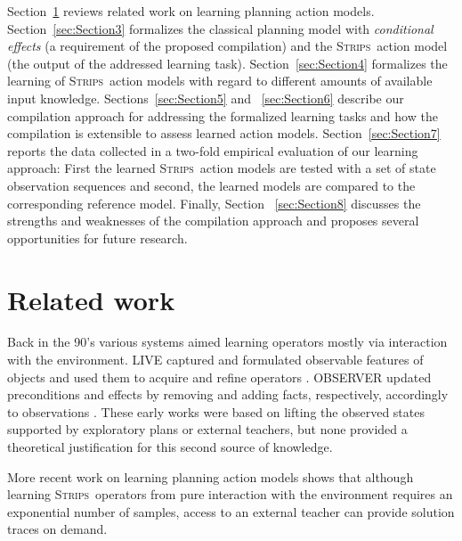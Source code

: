 \documentclass[3p,times]{elsarticle}
\newcommand{\strips}{\textsc{Strips}}     %
\begin{document}
Section~\ref{sec:Section2} reviews related work on learning planning action models. Section~\ref{sec:Section3} formalizes the classical planning model with {\em conditional effects} (a requirement of the proposed compilation) and the \strips\ action model (the output of the addressed learning task). Section~\ref{sec:Section4} formalizes the learning of \strips\ action models with regard to different amounts of available input knowledge. Sections~\ref{sec:Section5} and ~\ref{sec:Section6} describe our compilation approach for addressing the formalized learning tasks and how the compilation is extensible to assess learned action models. Section~\ref{sec:Section7} reports the data collected in a two-fold empirical evaluation of our learning approach: First the learned \strips\ action models are tested with a set of state observation sequences and second, the learned models are compared to the corresponding reference model. Finally, Section ~\ref{sec:Section8} discusses the strengths and weaknesses of the compilation approach and proposes several opportunities for future research.



\section{Related work}
\label{sec:Section2}
Back in the 90's various systems aimed learning operators mostly via interaction with the environment. {\sc LIVE} captured and formulated observable features of objects and used them to acquire and refine operators \cite{ShenS89}. {\sc OBSERVER} updated preconditions and effects by removing and adding facts, respectively, accordingly to observations \cite{Wang95learningby}. These early works were based on lifting the observed states supported by exploratory plans or external teachers, but none provided a theoretical justification for this second source of knowledge.

More recent work on learning planning action models \cite{WalshL08} shows that although learning \strips\ operators from pure interaction with the environment requires an exponential number of samples, access to an external teacher can provide solution traces on demand.
\end{document}
